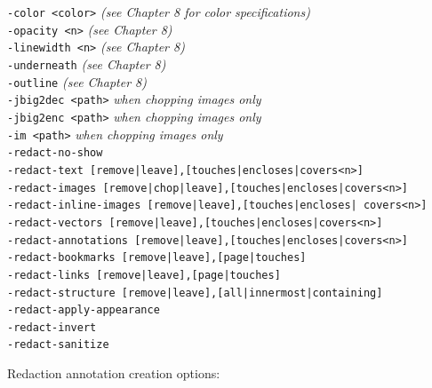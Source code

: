 \documentclass{book}
\begin{document}
{\begin{framed}
  \vspace{1.5mm}
  \noindent\verb!-color <color>! \textit{(see Chapter 8 for color specifications)}\\
  \noindent\verb!-opacity <n>! \textit{(see Chapter 8)}\\
  \noindent\verb!-linewidth <n>! \textit{(see Chapter 8)}\\
  \noindent\verb!-underneath! \textit{(see Chapter 8)}\\
  \noindent\verb!-outline! \textit{(see Chapter 8)}\\
  \noindent\verb!-jbig2dec <path>! \textit{when chopping images only}\\
  \noindent\verb!-jbig2enc <path>! \textit{when chopping images only}\\
  \noindent\verb!-im <path>! \textit{when chopping images only}\\
  \noindent\verb!-redact-no-show!\\
  \noindent\verb!-redact-text [remove|leave],[touches|encloses|covers<n>]!\\
  \noindent\verb!-redact-images [remove|chop|leave],[touches|encloses|covers<n>]!\\
  \noindent\verb!-redact-inline-images [remove|leave],[touches|encloses| covers<n>]!\\
  \noindent\verb!-redact-vectors [remove|leave],[touches|encloses|covers<n>]!\\
  \noindent\verb!-redact-annotations [remove|leave],[touches|encloses|covers<n>]!\\
  \noindent\verb!-redact-bookmarks [remove|leave],[page|touches]!\\
  \noindent\verb!-redact-links [remove|leave],[page|touches]!\\
  \noindent\verb!-redact-structure [remove|leave],[all|innermost|containing]!\\
  \noindent\verb!-redact-apply-appearance!\\
  \noindent\verb!-redact-invert!\\
  \noindent\verb!-redact-sanitize!

\vspace{3.5mm}
\noindent Redaction annotation creation options:


\end{framed}}
\end{document}

